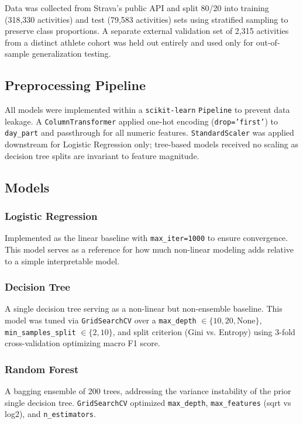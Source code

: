 \documentclass[11pt, onecolumn]{article}
\begin{document}
Data was collected from Strava's public API and split 80/20 into training (318,330 activities) and test (79,583 activities) sets using stratified sampling to preserve class proportions. A separate external validation set of 2,315 activities from a distinct athlete cohort was held out entirely and used only for out-of-sample generalization testing. 

\subsection{Preprocessing Pipeline}

All models were implemented within a \texttt{scikit-learn} \texttt{Pipeline} to prevent data leakage. A \texttt{ColumnTransformer} applied one-hot encoding (\texttt{drop='first'}) to \texttt{day\_part} and passthrough for all numeric features. \texttt{StandardScaler} was applied downstream for Logistic Regression only; tree-based models received no scaling as decision tree splits are invariant to feature magnitude.

\subsection{Models}

\subsubsection{Logistic Regression}
Implemented as the linear baseline with \texttt{max\_iter=1000} to ensure convergence. This model serves as a reference for how much non-linear modeling adds relative to a simple interpretable model. 

\subsubsection{Decision Tree}
A single decision tree serving as a non-linear but non-ensemble baseline. This model was tuned via \texttt{GridSearchCV} over a  \texttt{max\_depth} $\in \{10, 20, \text{None}\}$, \texttt{min\_samples\_split} $\in \{2, 10\}$, and split criterion (Gini vs. Entropy)  using 3-fold cross-validation optimizing macro F1 score.

\subsubsection{Random Forest}
A bagging ensemble of 200 trees, addressing the variance instability of the prior single decision tree. \texttt{GridSearchCV} optimized \texttt{max\_depth}, \texttt{max\_features} (sqrt vs log2), and \texttt{n\_estimators}.
\end{document}
